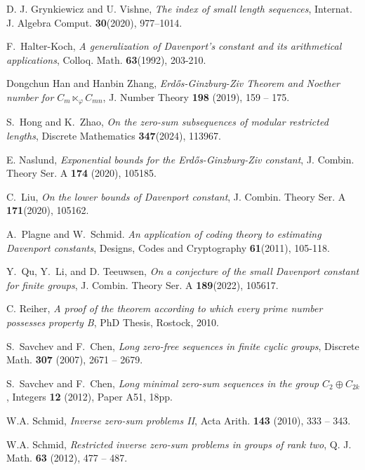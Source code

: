 \documentclass[11pt]{amsart}
\theoremstyle{definition}
\numberwithin{equation}{section}
\begin{document}
\begin{thebibliography}{99}
  D. J. Grynkiewicz and U. Vishne,  \emph{The index of small length sequences}, Internat. J. Algebra Comput. \textbf{30}(2020), 977–1014.




F.~Halter-Koch,
\emph{A generalization of {D}avenport's constant and its arithmetical
applications},
Colloq. Math. \textbf{63}(1992), 203-210.



Dongchun Han and Hanbin Zhang, \emph{Erd{\H{o}}s-{G}inzburg-{Z}iv {T}heorem and {N}oether number for ${C}_m \ltimes_{\varphi} {C}_{mn}$}, J. Number Theory \textbf{198} (2019), 159 -- 175.

S.~Hong and K.~Zhao, \emph{On the zero-sum subsequences of modular restricted lengths}, Discrete Mathematics \textbf{347}(2024), 113967.

E. Naslund, \emph{Exponential bounds for the Erdős-Ginzburg-Ziv constant}, J.  Combin. Theory Ser. A \textbf{174} (2020), 105185.

C.~Liu,  \emph{On the lower bounds of Davenport constant}, J. Combin. Theory Ser. A  \textbf{171}(2020), 105162.

A.~Plagne and W.~Schmid. \emph{An application of coding theory to estimating Davenport constants}, Designs, Codes and Cryptography \textbf{61}(2011), 105-118.

Y.~Qu, Y.~Li, and D. Teeuwsen, \emph{On a conjecture of the small Davenport constant for finite groups}, J.  Combin. Theory Ser. A \textbf{189}(2022), 105617.

 C. Reiher, \emph{A proof of the theorem according to which every prime number possesses property B}, PhD Thesis, Rostock,
2010.


S.~Savchev and F.~Chen, \emph{Long zero-free sequences in finite cyclic
	groups}, Discrete Math. \textbf{307} (2007), 2671 -- 2679.

S.~Savchev and F.~Chen, \emph{Long minimal zero-sum sequences in the group ${C}_2 \oplus
	{C}_{2k}$}, Integers \textbf{12} (2012), Paper A51, 18pp.



W.A. Schmid, \emph{Inverse zero-sum problems {II}}, Acta Arith. \textbf{143}
(2010), 333 -- 343.

W.A. Schmid, \emph{Restricted inverse zero-sum problems in groups of rank two}, Q.
J. Math. \textbf{63} (2012), 477 -- 487.


\end{thebibliography}
\end{document}

